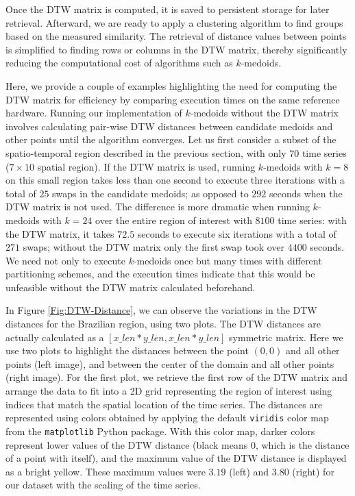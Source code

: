 Once the DTW matrix is computed, it is saved to persistent storage for later retrieval. Afterward, we are ready to apply a clustering algorithm to find groups based on the measured similarity. The retrieval of distance values between points is simplified to finding rows or columns in the DTW matrix, thereby significantly reducing the computational cost of algorithms such as $k$-medoids.

Here, we provide a couple of examples highlighting the need for computing the DTW matrix for efficiency by comparing execution times on the same reference hardware. Running our implementation of $k$-medoids without the DTW matrix involves calculating pair-wise DTW distances between candidate medoids and other points until the algorithm converges. Let us first consider a subset of the spatio-temporal region described in the previous section, with only $70$ time series ($7 \times 10$ spatial region). If the DTW matrix is used, running $k$-medoids with $k=8$ on this small region takes less than one second to execute three iterations with a total of $25$ swaps in the candidate medoids; as opposed to $292$ seconds when the DTW matrix is not used. The difference is more dramatic when running $k$-medoids with $k=24$ over the entire region of interest with $8100$ time series: with the DTW matrix, it takes $72.5$ seconds to execute six iterations with a total of $271$ swaps; without the DTW matrix only the first swap took over $4400$ seconds. We need not only to execute $k$-medoids once but many times with different partitioning schemes, and the execution times indicate that this would be unfeasible without the DTW matrix calculated beforehand.

In Figure \ref{Fig:DTW-Distance}, we can observe the variations in the DTW distances for the Brazilian region, using two plots. The DTW distances are actually calculated as a $[x\_len * y\_len, x\_len * y\_len]$ symmetric matrix. Here we use two plots to highlight the distances between the point $(0, 0)$ and all other points (left image), and between the center of the domain and all other points (right image). For the first plot, we retrieve the first row of the DTW matrix and arrange the data to fit into a 2D grid representing the region of interest using indices that match the spatial location of the time series. The distances are represented using colors obtained by applying the default \texttt{viridis} color map from the \texttt{matplotlib} Python package. With this color map, darker colors represent lower values of the DTW distance (black means 0, which is the distance of a point with itself), and the maximum value of the DTW distance is displayed as a bright yellow. These maximum values were $3.19$ (left) and $3.80$ (right) for our dataset with the scaling of the time series.

